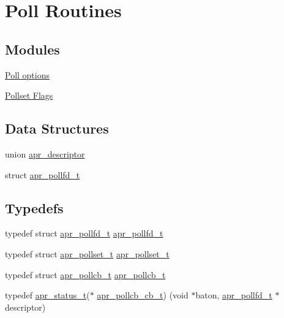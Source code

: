 \hypertarget{group__apr__poll}{}\section{Poll Routines}
\label{group__apr__poll}
\subsection*{Modules}
\begin{DoxyCompactItemize}
\item 
\hyperlink{group__pollopts}{Poll options}
\item 
\hyperlink{group__pollflags}{Pollset Flags}
\end{DoxyCompactItemize}
\subsection*{Data Structures}
\begin{DoxyCompactItemize}
\item 
union \hyperlink{unionapr__descriptor}{apr\+\_\+descriptor}
\item 
struct \hyperlink{structapr__pollfd__t}{apr\+\_\+pollfd\+\_\+t}
\end{DoxyCompactItemize}
\subsection*{Typedefs}
\begin{DoxyCompactItemize}
\item 
typedef struct \hyperlink{structapr__pollfd__t}{apr\+\_\+pollfd\+\_\+t} \hyperlink{group__apr__poll_ga0c89b184cbe2337e44207f1ad245129b}{apr\+\_\+pollfd\+\_\+t}
\item 
typedef struct \hyperlink{group__apr__poll_ga680da1f10ac5ef75efc503a9d15b8906}{apr\+\_\+pollset\+\_\+t} \hyperlink{group__apr__poll_ga680da1f10ac5ef75efc503a9d15b8906}{apr\+\_\+pollset\+\_\+t}
\item 
typedef struct \hyperlink{group__apr__poll_gae382e39bdf0c5a02fca7da3944bece08}{apr\+\_\+pollcb\+\_\+t} \hyperlink{group__apr__poll_gae382e39bdf0c5a02fca7da3944bece08}{apr\+\_\+pollcb\+\_\+t}
\item 
typedef \hyperlink{group__apr__errno_gaf76ee4543247e9fb3f3546203e590a6c}{apr\+\_\+status\+\_\+t}($\ast$ \hyperlink{group__apr__poll_ga1dcd8c87e233dbf105e83d50ef601f55}{apr\+\_\+pollcb\+\_\+cb\+\_\+t}) (void $\ast$baton, \hyperlink{structapr__pollfd__t}{apr\+\_\+pollfd\+\_\+t} $\ast$descriptor)
\end{DoxyCompactItemize}
